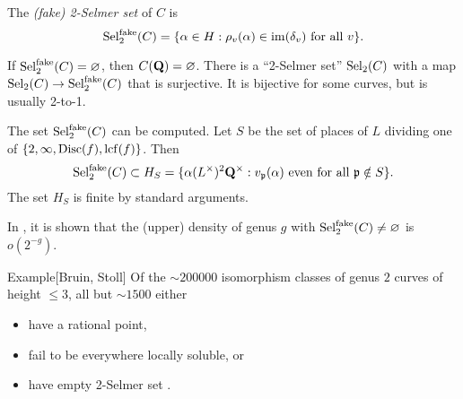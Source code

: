 \begin{defi}
The \emph{(fake) 2-Selmer set} of $C$ is 
\[
  \operatorname{Sel}_2^\mathrm{fake}(C) = \{\alpha\in H:\rho_v(\alpha)\in \operatorname{im}(\delta_v)\text{ for all }v\} .
\]
\end{defi}

If $\operatorname{Sel}_2^\mathrm{fake}(C)=\varnothing$, then $C(\mathbf{Q})=\varnothing$. 
There is a ``2-Selmer set'' $\operatorname{Sel}_2(C)$ with a map 
$\operatorname{Sel}_2(C) \to \operatorname{Sel}_2^\mathrm{fake}(C)$ that is surjective. It is 
bijective for some curves, but is usually 2-to-1. 

The set $\operatorname{Sel}_2^\mathrm{fake}(C)$ can be computed. Let $S$ be the set of 
places of $L$ dividing one of 
$\{2,\infty,\operatorname{Disc}(f),\operatorname{lcf}(f)\}$. Then 
\[
  \operatorname{Sel}_2^\mathrm{fake}(C)\subset H_S = \{\alpha (L^\times)^2\mathbf{Q}^\times:v_{\mathfrak{p}}(\alpha)\text{ even for all }\mathfrak{p}\notin S\} .
\]
The set $H_S$ is finite by standard arguments. 

In \cite{bg13}, it is shown that the (upper) density of genus $g$ 
with $\operatorname{Sel}_2^\mathrm{fake}(C)\ne\varnothing$ is $o(2^{-g})$. 

\begin{enonce}[remark]{Example}[Bruin, Stoll]
Of the $\sim 200000$ isomorphism classes of genus $2$ curves of height 
$\leqslant 3$, all but $\sim 1500$ either 
\begin{itemize}
  \item have a rational point, 
  \item fail to be everywhere locally soluble, or 
  \item have empty 2-Selmer set .
\end{itemize}
\end{enonce}




